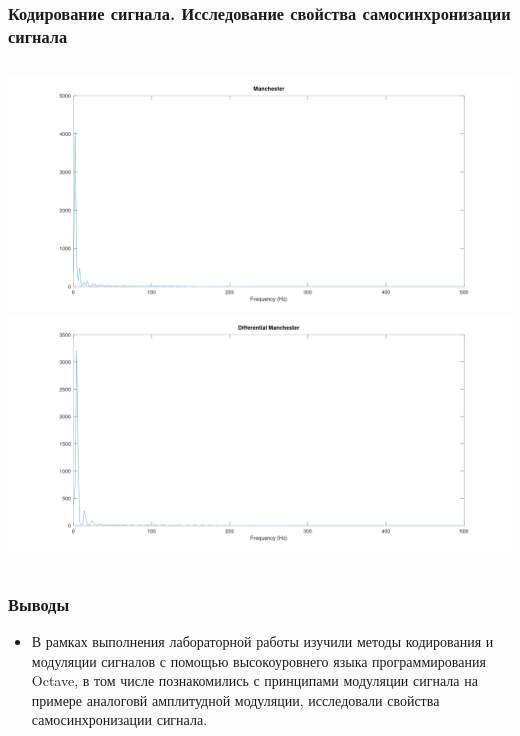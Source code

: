 \begin{frame}
\frametitle{Кодирование сигнала. Исследование свойства самосинхронизации сигнала}
\begin{columns}
            \includegraphics[width=\textwidth]{../octave/coding/spectre/manchester.png}
            \includegraphics[width=\textwidth]{../octave/coding/spectre/diffmanc.png}
\end{columns}
\end{frame}
\begin{frame}
\frametitle{Выводы}
\begin{itemize}
    \item В рамках выполнения лабораторной работы изучили методы кодирования и модуляции
сигналов с помощью высокоуровнего языка программирования Octave, в том числе
познакомились с принципами модуляции сигнала на примере аналоговй амплитудной
модуляции, исследовали свойства самосинхронизации сигнала.
\end{itemize}
\end{frame}

